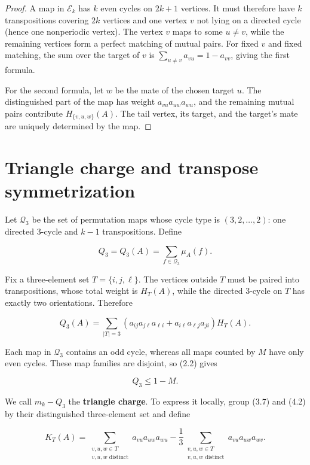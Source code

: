 \documentclass[11pt]{article}
\theoremstyle{remark}
\begin{document}
\begin{proof}
A map in $\mathcal E_k$ has $k$ even cycles on $2k+1$ vertices.
It must therefore have $k$ transpositions covering $2k$ vertices and one
vertex $v$ not lying on a directed cycle (hence one nonperiodic vertex). The
vertex $v$ maps to some $u\ne v$, while the remaining vertices form a perfect
matching of mutual pairs. For fixed $v$ and fixed matching, the sum over the
target of $v$ is
$\sum_{u\ne v}a_{vu}=1-a_{vv}$, giving the first formula.

For the second formula, let $w$ be the mate of the chosen target $u$.
The distinguished part of the map has weight
$a_{vu}a_{uw}a_{wu}$, and the remaining mutual pairs contribute
$H_{\{v,u,w\}}(A)$. The tail vertex, its target, and the target's mate are
uniquely determined by the map.
\end{proof}

\section{Triangle charge and transpose symmetrization}

Let $\mathcal Q_3$ be the set of permutation maps whose cycle type is
$(3,2,\ldots,2)$: one directed $3$-cycle and $k-1$ transpositions. Define

\[
Q_3=Q_3(A)=\sum_{f\in\mathcal Q_3}\mu_A(f).
\tag{4.1}
\]

Fix a three-element set $T=\{i,j,\ell\}$. The vertices outside $T$ must be
paired into transpositions, whose total weight is $H_T(A)$, while the
directed $3$-cycle on $T$ has exactly two orientations. Therefore

\[
Q_3(A)=\sum_{|T|=3}
\left(a_{ij}a_{j\ell}a_{\ell i}
+a_{i\ell}a_{\ell j}a_{ji}\right)H_T(A).
\tag{4.2}
\]

Each map in $\mathcal Q_3$ contains an odd cycle, whereas all maps counted by
$M$ have only even cycles. These map families are disjoint, so (2.2) gives

\[
Q_3\le1-M.
\tag{4.3}
\]

We call $m_k-Q_3$ the \textbf{triangle charge}. To express it locally, group
(3.7) and (4.2) by their distinguished three-element set and define

\[
K_T(A)=
\sum_{\substack{v,u,w\in T\\v,u,w\text{ distinct}}}
a_{vu}a_{uw}a_{wu}
-\frac13
\sum_{\substack{v,u,w\in T\\v,u,w\text{ distinct}}}
a_{vu}a_{uw}a_{wv}.
\tag{4.4}
\]
\end{document}
